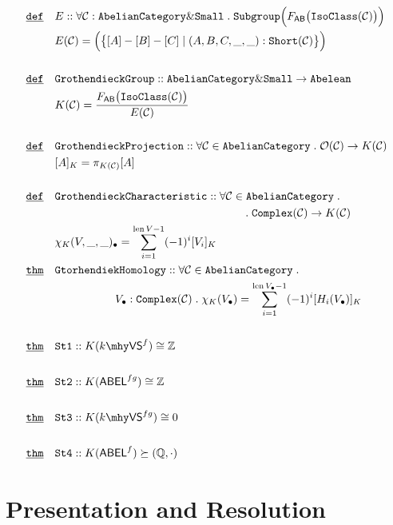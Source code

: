 \documentclass[12pt]{article}
\DeclareMathOperator*{\len}{\mathrm{len}}
\renewcommand{\.}{\; . \;}
\newcommand{\De}{\underline{\mathtt{def}} \quad}
\newcommand{\Thm}{\underline{\mathtt{thm}} \quad}
\newcommand{\Obj}[1]{\mathcal{O}(#1)}
\newcommand{\VS}[1]{#1 \mhy \mathsf{VS} }
\newcommand{\abel}{\mathtt{Abelean}}
\begin{document}
\newpage
\begin{align*}
\De & E :: \forall \mathcal{C} : \mathtt{AbelianCategory} \& \mathtt{Small} \. 
 \mathtt{Subgroup}\Big(F_{\mathsf{AB}}\big(\mathtt{IsoClass}(\mathcal{C})\big)\Big) \\
 &  E(\mathcal{C}) = \Big( \big\{ [A] - [B] - [C] \; | \; (A,B,C,\_,\_) : 
 \mathtt{Short}(\mathcal{C})  \big\} \Big)
 \\ \\
\De & \mathtt{GrothendieckGroup} :: \mathtt{AbelianCategory} \& \mathtt{Small} \to 
 \abel \\ \
 &  K(\mathcal{C}) = \frac{F_{\mathsf{AB}}\big(\mathtt{IsoClass}(\mathcal{C})\big)}{E(\mathcal{C})}
 \\ \\
  \De & \mathtt{GrothendieckProjection} :: 
  \forall \mathcal{C} \in \mathtt{AbelianCategory}  \. \Obj{\mathcal{C}} \to K(\mathcal{C})
  \\  &[A]_K = \pi_{K(\mathcal{C})} [A] \\ \\
  \De & \mathtt{GrothendieckCharacteristic} :: \forall   \mathcal{C} \in \mathtt{AbelianCategory}  	        \.  	\\  & \kern 14pc \. \mathtt{Complex}(\mathcal{C}) \to K(\mathcal{C}) \\
  & \chi_K(V, \_, \_ )_\bullet = \sum_{i=1}^{\len V - 1} (-1)^{i}[V_i]_K  \\
  \Thm & \mathtt{GtorhendiekHomology}  :: \forall  \mathcal{C} \in \mathtt{AbelianCategory} \.  \\ & \kern 4.5pc V_\bullet : \mathtt{Complex}(\mathcal{C})
 \.\chi_K(V_\bullet)  = \sum^{\len V_\bullet - 1}_{i = 1} (-1)^i [ H_i(V_\bullet) ]_K \\ \\
 \Thm &   \mathtt{St1}:: K(\VS{k}^{f})\cong \mathbb{Z} \\ \\ 
  \Thm &   \mathtt{St2}:: K(\mathsf{ABEL}^{fg})\cong \mathbb{Z} \\ \\ 
 \Thm & \mathtt{St3} :: K(\VS{k}^{fg}) \cong 0 \\ \\
  \Thm & \mathtt{St4} :: K(\mathsf{ABEL}^{f}) \succeq (\mathbb{Q}, \cdot) 
\end{align*}
\newpage
\section{Presentation and Resolution}
\end{document}
